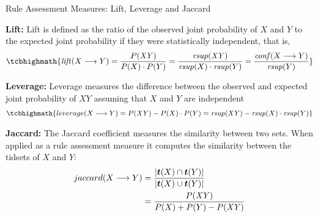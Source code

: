 \begin{frame}{Rule Assessment Measures: Lift, Leverage and Jaccard}

  {\bf Lift:}
Lift 
is def\/{i}ned as the ratio of the observed joint
probability of $X$ and $Y$ to the expected joint probability if they
were statistically independent, that is,
\begin{align*}
\tcbhighmath{
   \lift (X \arule Y) = \frac{P(\mathit{XY})}{P(X) \cdot P(Y)} =
   \frac{\rsupp(\mathit{XY})}{\rsupp(X)\cdot\rsupp(Y)} = \frac{\conff(X\arule
   Y)}{\rsupp(Y)}
}
\end{align*}

\medskip
{\bf Leverage:}
Leverage 
measures the difference between the
observed and expected joint probability of $XY$ assuming that $X$ and
$Y$ are independent
\begin{align*}
\tcbhighmath{
  \leverage (X \arule Y) = P(\mathit{XY}) - P(X) \cdot P(Y) = \rsupp(\mathit{XY}) -
  \rsupp(X) \cdot \rsupp(Y)
}
\end{align*}

{\bf Jaccard:}
The Jaccard coeff\/{i}cient
measures the similarity
between
two sets. When applied as a rule assessment measure it computes the
similarity between the tidsets of $X$ and $Y$:
\begin{align*}
\jaccard (X \arule Y) & =
\frac{\card{\vT(X) \cap \vT(Y)}}{\card{\vT(X) \cup \vT(Y)}}\\
& = \frac{P(\mathit{XY})}{P(X)+P(Y)-P(\mathit{XY})}
\end{align*}


\end{frame}

